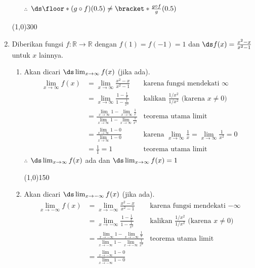 \begin{enumerate}[leftmargin=*, label={\arabic*}.]
\begin{enumerate}[label={\alph*}.]
$\therefore$ 
$\ds \floor*{(g \circ f)(0.5)} \neq \bracket*{\frac{g \circ f}{g}}(0.5)$
\end{enumerate}
\begin{center}
    \line(1,0){300}
\end{center}
\item Diberikan fungsi $f\colon \mathbb{R} \to \mathbb{R}$ dengan $f(1)=f(-1)=1$ 
dan $\ds f(x) = \frac{x^{2}-x}{x^{2}-1}$ untuk $x$ lainnya.
\begin{enumerate}[label={\alph*}.]
    \item Akan dicari $\ds \lim_{x \to \infty} f(x)$ (jika ada).
    \begin{align*}
        \lim_{x \to \infty} f(x) 
        &= \lim_{x \to \infty} \frac{x^{2}-x}{x^{2}-1}
        &\text{karena fungsi mendekati $\infty$}\\
        &= \lim_{x \to \infty} \frac{1-\frac{1}{x}}{1-\frac{1}{x^{2}}}
        &\text{kalikan $\frac{1/x^{2}}{1/x^{2}}$ (karena $x \neq 0$)}\\
        &=\frac{\lim_{x \to \infty} 1 - \lim_{x \to \infty} \frac{1}{x}}
        {\lim_{x \to \infty} 1 - \lim_{x \to \infty}\frac{1}{x^{2}}}
        &\text{teorema utama limit}\\
        &= \frac{\lim_{x \to \infty} 1 - 0}{\lim_{x \to \infty} 1 - 0}
        &\text{karena $\lim_{x\to\infty}\frac{1}{x} = \lim_{x\to\infty}\frac{1}{x^{2}} = 0$}\\
        &= \frac{1}{1} = 1
        &\text{teorema utama limit}
    \end{align*} 
    $\therefore$ $\ds \lim_{x \to \infty} f(x)$ ada dan 
    $\ds \lim_{x \to \infty} f(x) = 1$
\begin{center}
    \line(1,0){150}
\end{center}
    \item Akan dicari $\ds \lim_{x \to -\infty} f(x)$ (jika ada).
    \begin{align*}
        \lim_{x \to -\infty} f(x) 
        &= \lim_{x \to -\infty} \frac{x^{2}-x}{x^{2}-1}
        &\text{karena fungsi mendekati $-\infty$}\\
        &= \lim_{x \to -\infty} \frac{1-\frac{1}{x}}{1-\frac{1}{x^{2}}}
        &\text{kalikan $\frac{1/x^{2}}{1/x^{2}}$ (karena $x \neq 0$)}\\
        &=\frac{\lim_{x \to -\infty} 1 - \lim_{x \to -\infty} \frac{1}{x}}
        {\lim_{x \to- \infty} 1 - \lim_{x \to -\infty}\frac{1}{x^{2}}}
        &\text{teorema utama limit}\\
        &= \frac{\lim_{x \to -\infty} 1 - 0}{\lim_{x \to -\infty} 1 - 0}

\end{align*}
\end{enumerate}
\end{enumerate}
